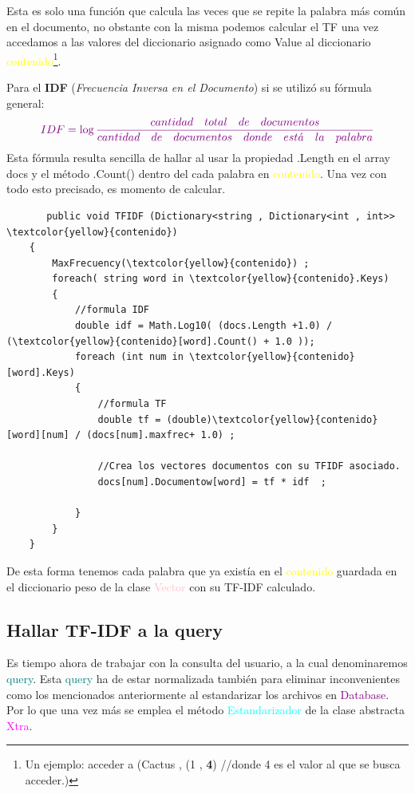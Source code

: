 \documentclass{article}
\begin{document}
Esta es solo una función que calcula las veces que se repite la palabra más común en el documento, no obstante con la misma podemos calcular el TF una vez accedamos a las valores del diccionario asignado como Value al diccionario \textcolor{yellow!80!black}{\textcolor{yellow}{contenido}}\footnote{Un ejemplo: acceder a (Cactus , (1 , \textbf{4}) //donde 4 es el valor al que se busca acceder.)}.

Para el \textbf{IDF} (\emph{Frecuencia Inversa en el Documento}) si se utilizó su fórmula general:
            \begin{equation}
               \textcolor{violet!100!black} {IDF =  \log \frac{cantidad\quad total\quad de\quad documentos}{cantidad\quad de\quad documentos\quad donde\quad est\acute{a}\quad la\quad palabra} }
            \end{equation}
Esta fórmula resulta sencilla de hallar al usar la propiedad .Length en el array docs y el método .Count() dentro del cada palabra en \textcolor{yellow!80!black}{\textcolor{yellow}{contenido}}.
Una vez con todo esto precisado, es momento de calcular.


\begin{lstlisting}
       public void TFIDF (Dictionary<string , Dictionary<int , int>> \textcolor{yellow}{contenido})
    {   
        MaxFrecuency(\textcolor{yellow}{contenido}) ; 
        foreach( string word in \textcolor{yellow}{contenido}.Keys)
        {
            //formula IDF
            double idf = Math.Log10( (docs.Length +1.0) / (\textcolor{yellow}{contenido}[word].Count() + 1.0 ));
            foreach (int num in \textcolor{yellow}{contenido}[word].Keys)
            {
                //formula TF
                double tf = (double)\textcolor{yellow}{contenido}[word][num] / (docs[num].maxfrec+ 1.0) ;
                
                //Crea los vectores documentos con su TFIDF asociado.
                docs[num].Documentow[word] = tf * idf  ;
                
            }
        }    
    }   
\end{lstlisting}
De esta forma tenemos cada palabra que ya existía en el \textcolor{yellow!80!black}{\textcolor{yellow}{contenido}} guardada en el diccionario peso de la clase \textcolor{pink}{Vector} con su TF-IDF calculado.

\subsection{Hallar TF-IDF a la query}
Es tiempo ahora de trabajar con la consulta del usuario, a la cual denominaremos \textcolor{teal}{query}. Esta \textcolor{teal}{query} ha de estar normalizada también para eliminar inconvenientes como los mencionados anteriormente al estandarizar los archivos en \textcolor{purple}{Database}. Por lo que una vez más se emplea el método \textcolor{cyan}{Estandarizador} de la clase abstracta \textcolor{magenta}{Xtra}.
\end{document}
